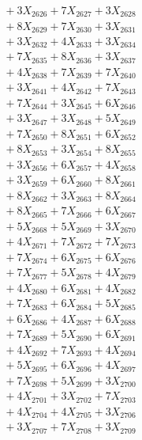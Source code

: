 \documentclass[a4paper,10pt]{article}
\begin{document}
{\begin{align}
&\;  + 3 X_{2626} + 7 X_{2627} + 3 X_{2628} \\[0.3ex]
&\;  + 8 X_{2629} + 7 X_{2630} + 3 X_{2631} \\[0.3ex]
&\;  + 3 X_{2632} + 4 X_{2633} + 3 X_{2634} \\[0.3ex]
&\;  + 7 X_{2635} + 8 X_{2636} + 3 X_{2637} \\[0.3ex]
&\;  + 4 X_{2638} + 7 X_{2639} + 7 X_{2640} \\[0.3ex]
&\;  + 3 X_{2641} + 4 X_{2642} + 7 X_{2643} \\[0.3ex]
&\;  + 7 X_{2644} + 3 X_{2645} + 6 X_{2646} \\[0.3ex]
&\;  + 3 X_{2647} + 3 X_{2648} + 5 X_{2649} \\[0.5ex]\allowbreak
&\;  + 7 X_{2650} + 8 X_{2651} + 6 X_{2652} \\[0.3ex]
&\;  + 8 X_{2653} + 3 X_{2654} + 8 X_{2655} \\[0.3ex]
&\;  + 3 X_{2656} + 6 X_{2657} + 4 X_{2658} \\[0.3ex]
&\;  + 3 X_{2659} + 6 X_{2660} + 8 X_{2661} \\[0.3ex]
&\;  + 8 X_{2662} + 3 X_{2663} + 8 X_{2664} \\[0.3ex]
&\;  + 8 X_{2665} + 7 X_{2666} + 6 X_{2667} \\[0.3ex]
&\;  + 5 X_{2668} + 5 X_{2669} + 3 X_{2670} \\[0.3ex]
&\;  + 4 X_{2671} + 7 X_{2672} + 7 X_{2673} \\[0.3ex]
&\;  + 7 X_{2674} + 6 X_{2675} + 6 X_{2676} \\[0.3ex]
&\;  + 7 X_{2677} + 5 X_{2678} + 4 X_{2679} \\[0.5ex]\allowbreak
&\;  + 4 X_{2680} + 6 X_{2681} + 4 X_{2682} \\[0.3ex]
&\;  + 7 X_{2683} + 6 X_{2684} + 5 X_{2685} \\[0.3ex]
&\;  + 6 X_{2686} + 4 X_{2687} + 6 X_{2688} \\[0.3ex]
&\;  + 7 X_{2689} + 5 X_{2690} + 6 X_{2691} \\[0.3ex]
&\;  + 4 X_{2692} + 7 X_{2693} + 4 X_{2694} \\[0.3ex]
&\;  + 5 X_{2695} + 6 X_{2696} + 4 X_{2697} \\[0.3ex]
&\;  + 7 X_{2698} + 5 X_{2699} + 3 X_{2700} \\[0.3ex]
&\;  + 4 X_{2701} + 3 X_{2702} + 7 X_{2703} \\[0.3ex]
&\;  + 4 X_{2704} + 4 X_{2705} + 3 X_{2706} \\[0.3ex]
&\;  + 3 X_{2707} + 7 X_{2708} + 3 X_{2709} \\[0.5ex]\allowbreak

\end{align}}
\end{document}
